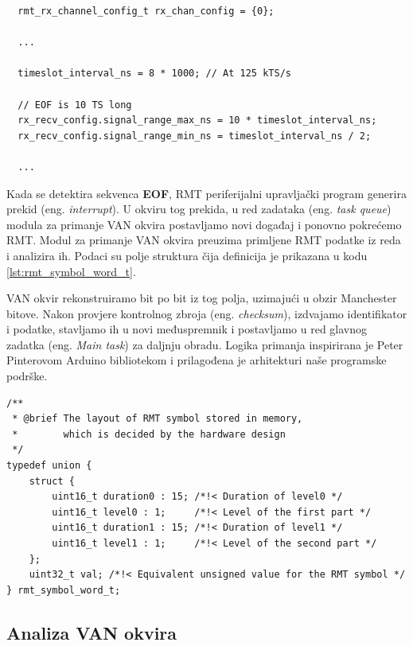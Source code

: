 \begin{listing}[H]
  \begin{verbatim}
  rmt_rx_channel_config_t rx_chan_config = {0};
  
  ...
  
  timeslot_interval_ns = 8 * 1000; // At 125 kTS/s
  
  // EOF is 10 TS long
  rx_recv_config.signal_range_max_ns = 10 * timeslot_interval_ns;
  rx_recv_config.signal_range_min_ns = timeslot_interval_ns / 2;
  
  ...
  \end{verbatim}
  \caption{RMT vremenska inicijalizacija}
\end{listing}

\noindent
Kada se detektira sekvenca \textbf{EOF}, RMT periferijalni upravljački program generira prekid (eng. \textit{interrupt}). 
U okviru tog prekida, u red zadataka (eng. \textit{task queue}) modula za primanje VAN okvira postavljamo novi događaj i ponovno pokrećemo RMT. 
Modul za primanje VAN okvira preuzima primljene RMT podatke iz reda i analizira ih. 
Podaci su polje struktura čija definicija je prikazana u kodu \ref{lst:rmt_symbol_word_t}.

VAN okvir rekonstruiramo bit po bit iz tog polja, uzimajući u obzir Manchester bitove. 
Nakon provjere kontrolnog zbroja (eng. \textit{checksum}), izdvajamo identifikator i podatke, 
stavljamo ih u novi međuspremnik i postavljamo u red glavnog zadatka (eng. \textit{Main task}) za daljnju obradu. 
Logika primanja inspirirana je Peter Pinterovom Arduino bibliotekom \cite{esp32_rmt_van} i prilagođena je arhitekturi naše programske podrške.

\begin{listing}[H]
  \begin{verbatim}
/**
 * @brief The layout of RMT symbol stored in memory, 
 *        which is decided by the hardware design
 */
typedef union {
    struct {
        uint16_t duration0 : 15; /*!< Duration of level0 */
        uint16_t level0 : 1;     /*!< Level of the first part */
        uint16_t duration1 : 15; /*!< Duration of level1 */
        uint16_t level1 : 1;     /*!< Level of the second part */
    };
    uint32_t val; /*!< Equivalent unsigned value for the RMT symbol */
} rmt_symbol_word_t;
  \end{verbatim}
  \caption{Definicija RMT podatkovnih simbola u ESP-IDF}
  \label{lst:rmt_symbol_word_t}
\end{listing}

\subsection{Analiza VAN okvira}

